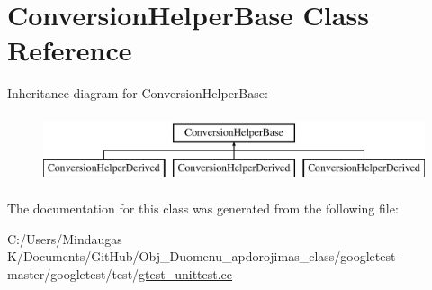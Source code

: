 \hypertarget{class_conversion_helper_base}{}\section{Conversion\+Helper\+Base Class Reference}
\label{class_conversion_helper_base}
Inheritance diagram for Conversion\+Helper\+Base\+:\begin{figure}[H]
\begin{center}
\leavevmode
\includegraphics[height=2.000000cm]{d9/d89/class_conversion_helper_base}
\end{center}
\end{figure}


The documentation for this class was generated from the following file\+:\begin{DoxyCompactItemize}
\item 
C\+:/\+Users/\+Mindaugas K/\+Documents/\+Git\+Hub/\+Obj\+\_\+\+Duomenu\+\_\+apdorojimas\+\_\+class/googletest-\/master/googletest/test/\mbox{\hyperlink{googletest-master_2googletest_2test_2gtest__unittest_8cc}{gtest\+\_\+unittest.\+cc}}\end{DoxyCompactItemize}
